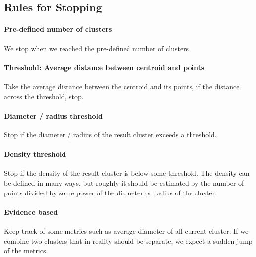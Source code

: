 \subsection{Rules for Stopping} 
\paragraph{Pre-defined number of clusters} We stop when we reached the pre-defined number of clusters

\paragraph{Threshold: Average distance between centroid and points} Take the average distance between the centroid and its points, if the distance across the threshold, stop. 

\paragraph{Diameter / radius threshold} Stop if the diameter / radius of the result cluster exceeds a threshold. 

\paragraph{Density threshold} Stop if the density of the result cluster is below some threshold. The density can be defined in many ways, but roughly it should be estimated by the number of points divided by some power of the diameter or radius of the cluster. 

\paragraph{Evidence based} Keep track of some metrics such as average diameter of all current cluster. If we combine two clusters that in reality should be separate, we expect a sudden jump of the metrics. 

